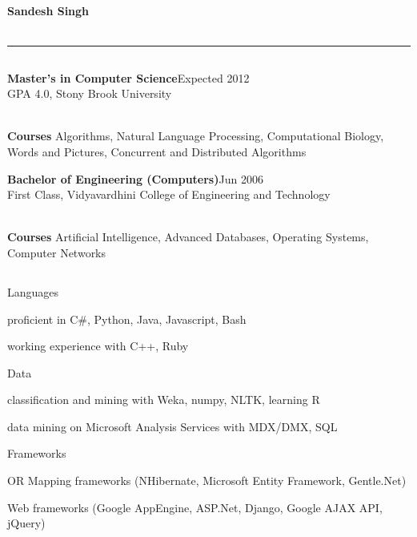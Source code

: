 \documentclass[a4paper,11pt,final]{article}
\newcommand{\resumetitle}[1]{%
  \subsection*{%
    \large\sc{#1}%
    \normalsize
  }%
  
}%
\newcommand{\eduexp}[3]{%
\noindent\textbf{#1}\hfill{#2}\normalsize\\{#3}\vspace{3pt}%
}
\newcommand{\resumedescheader}[1]{%
  \smallskip%
  \resumetitle{#1}
}%
\newenvironment{resumedescription}{%
  \begin{basedescript}{\desclabelstyle{\multilinelabel}\desclabelwidth{0.15\linewidth}}{%
      \renewcommand{\makelabel}[1]{{##1}}%
    }%
      \setlength{\itemsep}{0pt}
}{%
  \end{basedescript}%
}
\begin{document}
\pagestyle{empty}

\begin{center}
  \centering\Large\textbf{Sandesh Singh}\normalsize \\
   \\
  \rule[2pt]{0.99\linewidth}{.1pt}
\end{center}

\vspace{-10pt}
\resumedescheader{Education}
\eduexp
	{Master's in Computer Science}
	{Expected 2012}
	{GPA 4.0, Stony Brook University}
\\ \noindent \textbf{Courses} Algorithms, Natural Language Processing, Computational Biology, Words and Pictures, Concurrent and Distributed Algorithms
\\
\vspace{0pt}

\eduexp
	{Bachelor of Engineering (Computers)}
	{Jun 2006}
	{First Class, Vidyavardhini College of Engineering and Technology}
\\ \noindent \textbf{Courses} Artificial Intelligence, Advanced Databases, Operating Systems, Computer Networks

\resumedescheader{Skills}
\begin{resumedescription}
\item [Languages]
\begin{itemize*}
  \item proficient in C\#, Python, Java, Javascript, Bash
  \item working experience with C++, Ruby
\end{itemize*}

\item [Data] 
\begin{itemize*}
  \item classification and mining with Weka, numpy, NLTK, learning R
  \item data mining on Microsoft Analysis Services with MDX/DMX, SQL
\end{itemize*}

\item [Frameworks]
\begin{itemize*}
  \item OR Mapping frameworks (NHibernate, Microsoft Entity Framework, Gentle.Net)
  \item Web frameworks (Google AppEngine, ASP.Net, Django, Google AJAX API, jQuery)
\end{itemize*}

\end{resumedescription}
\end{document}
